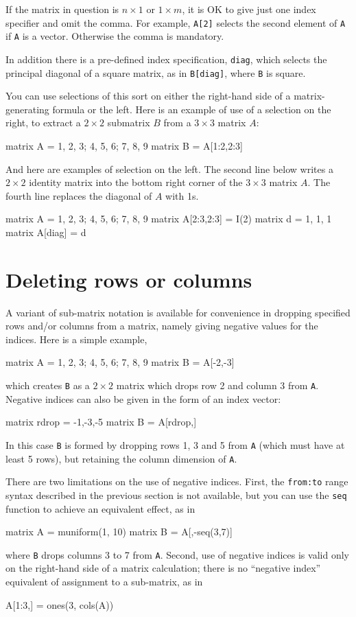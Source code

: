 If the matrix in question is $n\times 1$ or $1\times m$, it is
OK to give just one index specifier and omit the comma. For example,
\texttt{A[2]} selects the second element of \texttt{A} if \texttt{A}
is a vector. Otherwise the comma is mandatory.

In addition there is a pre-defined index specification, \texttt{diag},
which selects the principal diagonal of a square matrix, as in
\texttt{B[diag]}, where \texttt{B} is square.

You can use selections of this sort on either the right-hand side of
a matrix-generating formula or the left.  Here is an example of use of
a selection on the right, to extract a $2\times 2$ submatrix $B$ from a
$3\times 3$ matrix $A$:
%
\begin{code}
matrix A = {1, 2, 3; 4, 5, 6; 7, 8, 9}
matrix B = A[1:2,2:3]
\end{code}
%
And here are examples of selection on the left.  The second line below
writes a $2\times 2$ identity matrix into the bottom right corner of the
$3\times 3$ matrix $A$.  The fourth line replaces the diagonal of $A$ 
with 1s.
%
\begin{code}
matrix A = {1, 2, 3; 4, 5, 6; 7, 8, 9}
matrix A[2:3,2:3] = I(2)
matrix d = {1, 1, 1}
matrix A[diag] = d
\end{code}

\section{Deleting rows or columns}
\label{sec:neg-indices}

A variant of sub-matrix notation is available for convenience in
dropping specified rows and/or columns from a matrix, namely giving
negative values for the indices. Here is a simple example,
%
\begin{code}
matrix A = {1, 2, 3; 4, 5, 6; 7, 8, 9}
matrix B = A[-2,-3]
\end{code}
%
which creates \texttt{B} as a $2\times 2$ matrix which drops row 2 and
column 3 from \texttt{A}. Negative indices can also be given in the
form of an index vector:
%
\begin{code}
matrix rdrop = {-1,-3,-5}
matrix B = A[rdrop,]
\end{code}
%
In this case \texttt{B} is formed by dropping rows 1, 3 and 5 from
\texttt{A} (which must have at least 5 rows), but retaining the column
dimension of \texttt{A}.

There are two limitations on the use of negative indices. First, the
\texttt{from:to} range syntax described in the previous section is not
available, but you can use the \texttt{seq} function to achieve an
equivalent effect, as in
%
\begin{code}
matrix A = muniform(1, 10)
matrix B = A[,-seq(3,7)]
\end{code}
%
where \texttt{B} drops columns 3 to 7 from \texttt{A}. Second, use of
negative indices is valid only on the right-hand side of a matrix
calculation; there is no ``negative index'' equivalent of assignment
to a sub-matrix, as in
%
\begin{code}
A[1:3,] = ones(3, cols(A))
\end{code}

